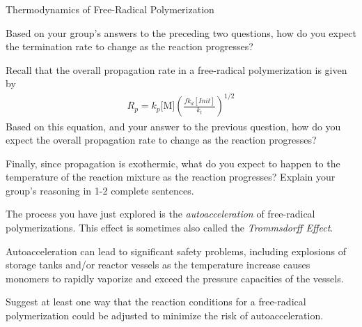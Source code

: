 \begin{activity}{Thermodynamics of Free-Radical Polymerization}
\begin{ctqs}
	\question Based on your group's answers to the preceding two questions, how do you expect the termination rate to change as the reaction progresses?
	
		\begin{solution}[1in]
		\end{solution}
	
	\question Recall that the overall propagation rate in a free-radical polymerization is given by
					\begin{align*}
						R_p = k_p\text{[M]}\left(\frac{fk_d[Init]}{k_t}\right)^{1/2}
					\end{align*}
		Based on this equation, and your answer to the previous question, how do you expect the overall propagation rate to change as the reaction progresses?
	
		\begin{solution}[1in]
		\end{solution}
		
	\question Finally, since propagation is exothermic, what do you expect to happen to the temperature of the reaction mixture as the reaction progresses?  Explain your group's reasoning in 1-2 complete sentences.
	
		\begin{solution}[2in]
		\end{solution}
		
\end{ctqs}

	\begin{infobox}
		The process you have just explored is the \emph{autoacceleration} of free-radical polymerizations.  This effect is sometimes also called the \emph{Trommsdorff Effect}.
		
		Autoacceleration can lead to significant safety problems, including explosions of storage tanks and/or reactor vessels as the temperature increase causes monomers to rapidly vaporize and exceed the pressure capacities of the vessels.
		
	\end{infobox}


\begin{ctqs}

	\question Suggest at least one way that the reaction conditions for a free-radical polymerization could be adjusted to minimize the risk of autoacceleration.
	
		\begin{solution}[2in]
		\end{solution}

\end{ctqs}


	


%
%	


	
\end{activity}